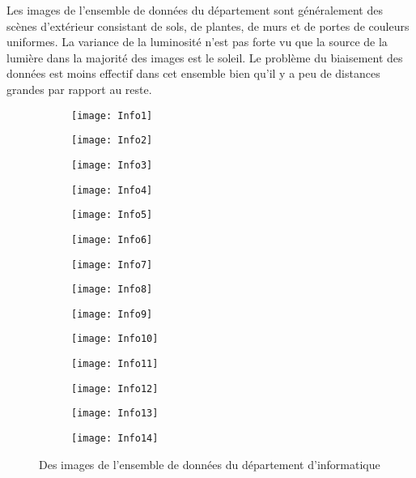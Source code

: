 Les images de l'ensemble de données du département sont généralement des scènes
d'extérieur consistant de sols, de plantes, de murs et de portes de couleurs uniformes.
La variance de la luminosité n'est pas forte vu que la source de la lumière dans
la majorité des images est le soleil. Le problème du biaisement des données est
moins effectif dans cet ensemble bien qu'il y a peu de distances grandes par rapport
au reste.

\bigskip

\begin{figure}[h]
\centering
\begin{subfigure}{0.125\textwidth}\texttt{[image: Info1]}\end{subfigure}
\begin{subfigure}{0.125\textwidth}\texttt{[image: Info2]}\end{subfigure}
\begin{subfigure}{0.125\textwidth}\texttt{[image: Info3]}\end{subfigure}
\begin{subfigure}{0.125\textwidth}\texttt{[image: Info4]}\end{subfigure}
\begin{subfigure}{0.125\textwidth}\texttt{[image: Info5]}\end{subfigure}
\begin{subfigure}{0.125\textwidth}\texttt{[image: Info6]}\end{subfigure}
\begin{subfigure}{0.125\textwidth}\texttt{[image: Info7]}\end{subfigure}
\begin{subfigure}{0.125\textwidth}\texttt{[image: Info8]}\end{subfigure}
\begin{subfigure}{0.125\textwidth}\texttt{[image: Info9]}\end{subfigure}
\begin{subfigure}{0.125\textwidth}\texttt{[image: Info10]}\end{subfigure}
\begin{subfigure}{0.125\textwidth}\texttt{[image: Info11]}\end{subfigure}
\begin{subfigure}{0.125\textwidth}\texttt{[image: Info12]}\end{subfigure}
\begin{subfigure}{0.125\textwidth}\texttt{[image: Info13]}\end{subfigure}
\begin{subfigure}{0.125\textwidth}\texttt{[image: Info14]}\end{subfigure}
\caption{Des images de l'ensemble de données du département d'informatique}
\end{figure}

